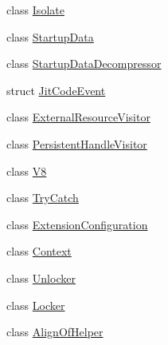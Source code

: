 \begin{DoxyCompactItemize}
class \hyperlink{classv8_1_1Isolate}{Isolate}
\item 
class \hyperlink{classv8_1_1StartupData}{Startup\-Data}
\item 
class \hyperlink{classv8_1_1StartupDataDecompressor}{Startup\-Data\-Decompressor}
\item 
struct \hyperlink{structv8_1_1JitCodeEvent}{Jit\-Code\-Event}
\item 
class \hyperlink{classv8_1_1ExternalResourceVisitor}{External\-Resource\-Visitor}
\item 
class \hyperlink{classv8_1_1PersistentHandleVisitor}{Persistent\-Handle\-Visitor}
\item 
class \hyperlink{classv8_1_1V8}{V8}
\item 
class \hyperlink{classv8_1_1TryCatch}{Try\-Catch}
\item 
class \hyperlink{classv8_1_1ExtensionConfiguration}{Extension\-Configuration}
\item 
class \hyperlink{classv8_1_1Context}{Context}
\item 
class \hyperlink{classv8_1_1Unlocker}{Unlocker}
\item 
class \hyperlink{classv8_1_1Locker}{Locker}
\item 
class \hyperlink{classv8_1_1AlignOfHelper}{Align\-Of\-Helper}
\end{DoxyCompactItemize}
